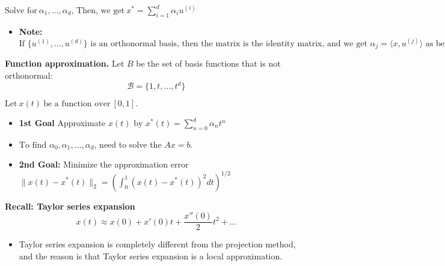 \begin{intuition}
        $\text{Solve for} \ \alpha_1, \dots, \alpha_d$, $\text{Then, we get} \ x^* = \sum_{i=1}^{d} \alpha_i u^{(i)}$
        \begin{itemize}
            \item \textbf{Note:} $\text{If } \{u^{(1)}, \dots, u^{(d)}\} \text{ is an orthonormal basis, then the matrix is the identity matrix, and we get } \alpha_j = \langle x, u^{(j)} \rangle \text{ as before.}$
        \end{itemize}
    \end{intuition}

    \begin{example}
        \textbf{Function approximation.}
        Let $B$ be the set of basis functions that is not orthonormal:
        \[
        \mathcal{B} = \{1, t, \dots, t^d\}
        \]

        $\text{Let} \ x(t) \ \text{be a function over} \ [0, 1].$
        \begin{itemize}
            \item \textbf{1st Goal} Approximate $x(t) \text{ by } x^*(t) = \sum_{n=0}^{d} \alpha_n t^n$
            \item $\text{To find } \alpha_0, \alpha_1, \dots, \alpha_d$, need to solve the $Ax=b$.
            \item \textbf{2nd Goal:} Minimize the approximation error $\|x(t) - x^*(t)\|_2 = \left( \int_0^1 (x(t) - x^*(t))^2 dt \right)^{1/2}$
        \end{itemize}

        \textbf{Recall: Taylor series expansion}
        \[
        x(t) \approx x(0) + x'(0) t + \frac{x''(0)}{2} t^2 + \dots
        \]

        \begin{itemize}
            \item Taylor series expansion is completely different from the projection method, and the reason is that Taylor series expansion is a local approximation.
        \end{itemize}

    \end{example}

